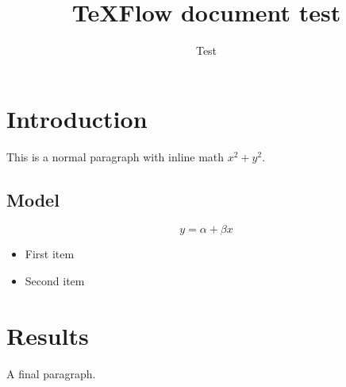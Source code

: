 \documentclass[11pt]{article}
\title{TeXFlow document test}
\author{Test}
\begin{document}
\maketitle
\section{Introduction}
This is a normal paragraph with inline math $x^2+y^2$.

\subsection{Model}
\[
y = \alpha + \beta x
\]

\begin{itemize}
\item First item
\item Second item
\end{itemize}

\section{Results}
A final paragraph.
\end{document}
